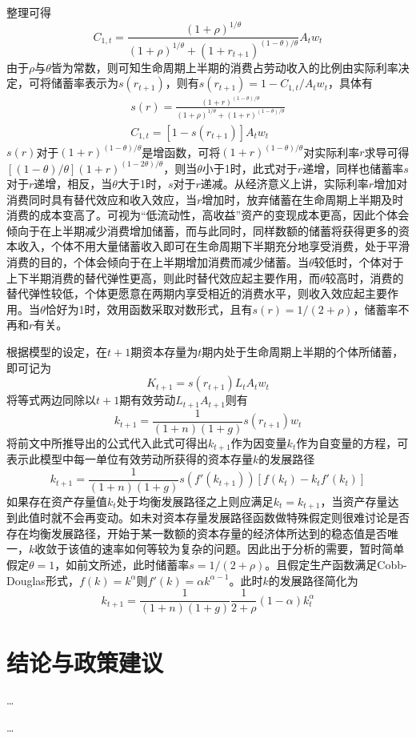 \documentclass[supercite]{HustGraduPaper}
\begin{document}
    整理可得
    \begin{equation}
    C_{1,t}=\frac{(1+\rho)^{1/\theta}}{(1+\rho)^{1/\theta}+(1+r_{t+1})^{(1-\theta)/\theta}}A_tw_t
    \end{equation}
    由于$\rho$与$\theta$皆为常数，则可知生命周期上半期的消费占劳动收入的比例由实际利率决定，可将储蓄率表示为$s(r_{t+1})$，则有$s(r_{t+1})=1-C_{1,t}/A_tw_t$，具体有
    \begin{equation}
    \begin{aligned}
    s(r)=\frac{(1+r)^{(1-\theta)/\theta}}{(1+\rho)^{1/\theta}+(1+r)^{(1-\theta)/\theta}}\\
    C_{1,t}=[1-s(r_{t+1})]A_tw_t
    \end{aligned}
    \end{equation}
    $s(r)$对于$(1+r)^{(1-\theta)/\theta}$是增函数，可将$(1+r)^{(1-\theta)/\theta}$对实际利率$r$求导可得$[(1-\theta)/\theta](1+r)^{(1-2\theta)/\theta}$，则当$\theta$小于1时，此式对于$r$递增，同样也储蓄率$s$对于$r$递增，相反，当$\theta$大于1时，$s$对于$r$递减。从经济意义上讲，实际利率$r$增加对消费同时具有替代效应和收入效应，当$r$增加时，放弃储蓄在生命周期上半期及时消费的成本变高了。可视为“低流动性，高收益”资产的变现成本更高，因此个体会倾向于在上半期减少消费增加储蓄，而与此同时，同样数额的储蓄将获得更多的资本收入，个体不用大量储蓄收入即可在生命周期下半期充分地享受消费，处于平滑消费的目的，个体会倾向于在上半期增加消费而减少储蓄。当$\theta$较低时，个体对于上下半期消费的替代弹性更高，则此时替代效应起主要作用，而$\theta$较高时，消费的替代弹性较低，个体更愿意在两期内享受相近的消费水平，则收入效应起主要作用。当$\theta$恰好为1时，效用函数采取对数形式，且有$s(r)=1/(2+\rho)$，储蓄率不再和$r$有关。

    根据模型的设定，在$t+1$期资本存量为$t$期内处于生命周期上半期的个体所储蓄，即可记为
    \begin{equation}
    K_{t+1}=s(r_{t+1})L_tA_tw_t
    \end{equation}
    将等式两边同除以$t+1$期有效劳动$L_{t+1}A_{t+1}$则有
    \begin{equation}
    k_{t+1}=\frac{1}{(1+n)(1+g)}s(r_{t+1})w_t
    \end{equation}
    将前文中所推导出的公式代入此式可得出$k_{t+1}$作为因变量$k_t$作为自变量的方程，可表示此模型中每一单位有效劳动所获得的资本存量$k$的发展路径
    \begin{equation}
    k_{t+1}=\frac{1}{(1+n)(1+g)}s(f'(k_{t+1}))[f(k_t)-k_tf'(k_t)]
    \end{equation}
    如果存在资产存量值$k_t$处于均衡发展路径之上则应满足$k_t=k_{t+1}$，当资产存量达到此值时就不会再变动。如未对资本存量发展路径函数做特殊假定则很难讨论是否存在均衡发展路径，开始于某一数额的资本存量的经济体所达到的稳态值是否唯一，$k$收敛于该值的速率如何等较为复杂的问题。因此出于分析的需要，暂时简单假定$\theta=1$，如前文所述，此时储蓄率$s=1/(2+\rho)$。且假定生产函数满足Cobb-Douglas形式，$f(k)=k^\alpha$则$f'(k)=\alpha k^{\alpha-1}$。此时$k$的发展路径简化为
    \begin{equation}
    k_{t+1}=\frac{1}{(1+n)(1+g)}\frac{1}{2+\rho}(1-\alpha)k_{t}^\alpha
    \end{equation}
    
    \section{结论与政策建议}
    \ldots
    
    \begin{thankpage}
    \ldots
    \end{thankpage}

    
    
\end{document}
